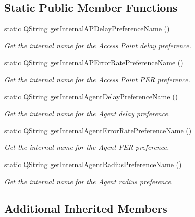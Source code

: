 \subsection*{Static Public Member Functions}
\begin{DoxyCompactItemize}
\item 
static Q\+String \hyperlink{classFlourishV2XFramework_ae087a92f4ca51d92c44c443c790f633c}{get\+Internal\+A\+P\+Delay\+Preference\+Name} ()
\begin{DoxyCompactList}\small\item\em Get the internal name for the Access Point delay preference. \end{DoxyCompactList}\item 
static Q\+String \hyperlink{classFlourishV2XFramework_ac3b5d93d4d9b2908f059921f804ccd22}{get\+Internal\+A\+P\+Error\+Rate\+Preference\+Name} ()
\begin{DoxyCompactList}\small\item\em Get the internal name for the Access Point P\+ER preference. \end{DoxyCompactList}\item 
static Q\+String \hyperlink{classFlourishV2XFramework_a53554640f6360668357a2079241a8d10}{get\+Internal\+Agent\+Delay\+Preference\+Name} ()
\begin{DoxyCompactList}\small\item\em Get the internal name for the Agent delay preference. \end{DoxyCompactList}\item 
static Q\+String \hyperlink{classFlourishV2XFramework_a4cd588c909b77b70157c5c5436050a7c}{get\+Internal\+Agent\+Error\+Rate\+Preference\+Name} ()
\begin{DoxyCompactList}\small\item\em Get the internal name for the Agent P\+ER preference. \end{DoxyCompactList}\item 
static Q\+String \hyperlink{classFlourishV2XFramework_a2d39fd13894cf679132ebf620f4e2821}{get\+Internal\+Agent\+Radius\+Preference\+Name} ()
\begin{DoxyCompactList}\small\item\em Get the internal name for the Agent radius preference. \end{DoxyCompactList}\end{DoxyCompactItemize}
\subsection*{Additional Inherited Members}


